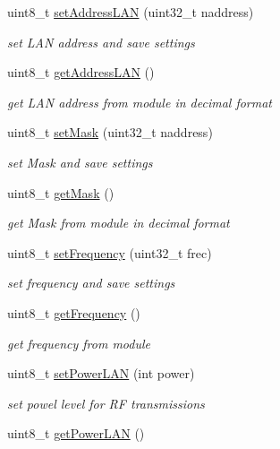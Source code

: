 \begin{DoxyCompactItemize}
uint8\+\_\+t \hyperlink{class_wasp_sigfox_ab6fb65e0427ffcc9daf32b60a701cf38}{set\+Address\+L\+AN} (uint32\+\_\+t naddress)
\begin{DoxyCompactList}\small\item\em set L\+AN address and save settings \end{DoxyCompactList}\item 
uint8\+\_\+t \hyperlink{class_wasp_sigfox_a8e49ad8d04663e7cdf4ff9af83800c9a}{get\+Address\+L\+AN} ()
\begin{DoxyCompactList}\small\item\em get L\+AN address from module in decimal format \end{DoxyCompactList}\item 
uint8\+\_\+t \hyperlink{class_wasp_sigfox_a1e5577698705243a55a59c7600d74190}{set\+Mask} (uint32\+\_\+t naddress)
\begin{DoxyCompactList}\small\item\em set Mask and save settings \end{DoxyCompactList}\item 
uint8\+\_\+t \hyperlink{class_wasp_sigfox_afa5ac9df8a8b0d6a45ba7bc5aaf37bf8}{get\+Mask} ()
\begin{DoxyCompactList}\small\item\em get Mask from module in decimal format \end{DoxyCompactList}\item 
uint8\+\_\+t \hyperlink{class_wasp_sigfox_a728ed26957044affbfe6fe687a14875b}{set\+Frequency} (uint32\+\_\+t frec)
\begin{DoxyCompactList}\small\item\em set frequency and save settings \end{DoxyCompactList}\item 
uint8\+\_\+t \hyperlink{class_wasp_sigfox_a332d1f2a56b57552f4e21d0a2e72583a}{get\+Frequency} ()
\begin{DoxyCompactList}\small\item\em get frequency from module \end{DoxyCompactList}\item 
uint8\+\_\+t \hyperlink{class_wasp_sigfox_ac12668ff4de9e82df8e1ac74e6a8f616}{set\+Power\+L\+AN} (int power)
\begin{DoxyCompactList}\small\item\em set powel level for RF transmissions \end{DoxyCompactList}\item 
uint8\+\_\+t \hyperlink{class_wasp_sigfox_a4c0c467f2aacd4c8687728cde74fd300}{get\+Power\+L\+AN} ()

\end{DoxyCompactItemize}
